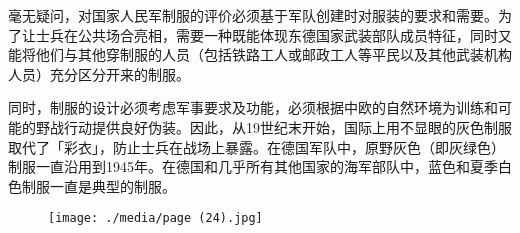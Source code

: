 毫无疑问，对国家人民军制服的评价必须基于军队创建时对服装的要求和需要。为了让士兵在公共场合亮相，需要一种既能体现东德国家武装部队成员特征，同时又能将他们与其他穿制服的人员（包括铁路工人或邮政工人等平民以及其他武装机构人员）充分区分开来的制服。

同时，制服的设计必须考虑军事要求及功能，必须根据中欧的自然环境为训练和可能的野战行动提供良好伪装。因此，从19世纪末开始，国际上用不显眼的灰色制服取代了「彩衣」，防止士兵在战场上暴露。在德国军队中，原野灰色（即灰绿色）制服一直沿用到1945年。在德国和几乎所有其他国家的海军部队中，蓝色和夏季白色制服一直是典型的制服。

\begin{figure}
\texttt{[image: ./media/page (24).jpg]}
\end{figure}

